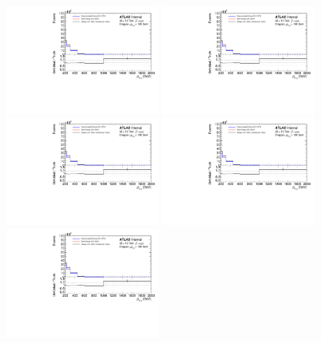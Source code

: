 \begin{figure}[h!]
  \centering
  \includegraphics[page=76,width=0.45\textwidth]{figures/IBUPlots.pdf}
  \includegraphics[page=77,width=0.45\textwidth]{figures/IBUPlots.pdf} \\
  \includegraphics[page=79,width=0.45\textwidth]{figures/IBUPlots.pdf}
  \includegraphics[page=80,width=0.45\textwidth]{figures/IBUPlots.pdf} \\
  \includegraphics[page=81,width=0.45\textwidth]{figures/IBUPlots.pdf}

\end{figure}
